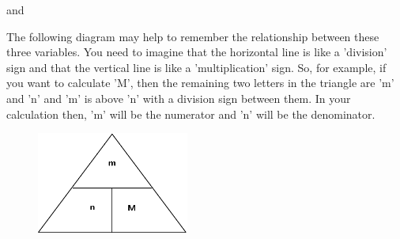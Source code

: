       
      \label{m38717*id277579}and\par 
      \label{m38717*id277584}\nopagebreak\noindent{}
    
      
      \label{m38717*id277605}The following diagram may help to remember the relationship between these three variables. You need to imagine that the horizontal line is like a 'division' sign and that the vertical line is like a 'multiplication' sign. So, for example, if you want to calculate 'M', then the remaining two letters in the triangle are 'm' and 'n' and 'm' is above 'n' with a division sign between them. In your calculation then, 'm' will be the numerator and 'n' will be the denominator.\par 
      \label{m38717*id277613}
        
    \setcounter{subfigure}{0}


	\begin{figure}[H] %
    \begin{center}
    \label{m38717*id277616!!!underscore!!!media}\label{m38717*id277616!!!underscore!!!printimage}\includegraphics[width=5cm]{col11305.imgs/m38717_CG11C6_001.png} %
        
      \vspace{2pt}
    \vspace{.1in}
    
    \end{center}

 \end{figure}   

